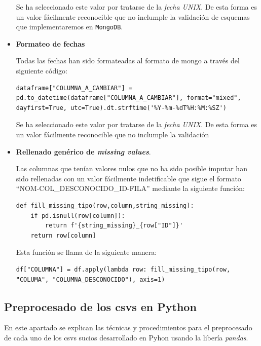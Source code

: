 \documentclass[]{article}
\begin{document}
\begin{itemize}
    Se ha seleccionado este valor por tratarse de la \textit{fecha UNIX}. De
    esta forma es un valor fácilmente reconocible que no inclumple la validación
    de esquemas que implementaremos en \texttt{MongoDB}.

    \item \textbf{Formateo de fechas}

    Todas las fechas han sido formateadas al formato de mongo a través del siguiente código:

    \begin{lstlisting}[caption=Formateo de fechas"]
dataframe["COLUMNA_A_CAMBIAR"] = pd.to_datetime(dataframe["COLUMNA_A_CAMBIAR"], format="mixed", dayfirst=True, utc=True).dt.strftime('%Y-%m-%dT%H:%M:%SZ')
    \end{lstlisting}

    Se ha seleccionado este valor por tratarse de la \textit{fecha UNIX}. De
    esta forma es un valor fácilmente reconocible que no inclumple la validación
    \item \textbf{Rellenado genérico de \textit{missing values}}. 
    
    Las columnas que tenían valores nulos que no ha sido posible imputar han sido rellenadas con un valor fácilmente indetificable que sigue el formato ``NOM-COL\_DESCONOCIDO\_ID-FILA'' mediante la siguiente función:

    \begin{lstlisting}[caption=Inputacion de valores faltantes desconocidos]
def fill_missing_tipo(row,column,string_missing):
    if pd.isnull(row[column]):
        return f'{string_missing}_{row["ID"]}'
    return row[column]
    \end{lstlisting}

    Esta función se llama de la siguiente manera:

    \begin{lstlisting}[caption=llamada a la función para rellenar valores faltantes]
df["COLUMNA"] = df.apply(lambda row: fill_missing_tipo(row, "COLUMA", "COLUMNA_DESCONOCIDO"), axis=1)
    \end{lstlisting}

\end{itemize}

\newpage
\subsection{Preprocesado de los csvs en Python}
\label{subsec:preprocessespecifico}
En este apartado se explican las técnicas y procedimientos para el preprocesado de cada uno de los csvs sucios desarrollado en Pyhon usando la libería \textit{pandas}.
\end{document}
